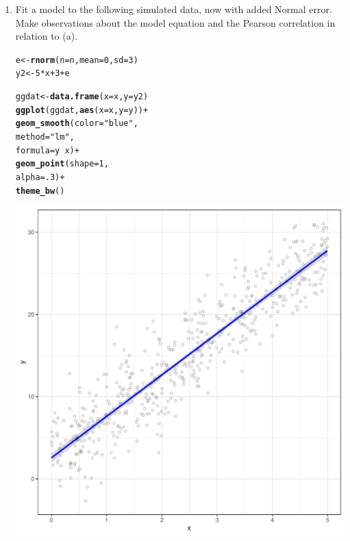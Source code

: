 \documentclass{article}\usepackage[]{graphicx}\usepackage[]{color}
\makeatletter
\def\maxwidth{ %
  \ifdim\Gin@nat@width>\linewidth
    \linewidth
  \else
    \Gin@nat@width
  \fi
}
\newcommand{\hlnum}[1]{\textcolor[rgb]{0.686,0.059,0.569}{#1}}%
\newcommand{\hlstr}[1]{\textcolor[rgb]{0.192,0.494,0.8}{#1}}%
\newcommand{\hlopt}[1]{\textcolor[rgb]{0,0,0}{#1}}%
\newcommand{\hlstd}[1]{\textcolor[rgb]{0.345,0.345,0.345}{#1}}%
\newcommand{\hlkwb}[1]{\textcolor[rgb]{0.69,0.353,0.396}{#1}}%
\newcommand{\hlkwc}[1]{\textcolor[rgb]{0.333,0.667,0.333}{#1}}%
\newcommand{\hlkwd}[1]{\textcolor[rgb]{0.737,0.353,0.396}{\textbf{#1}}}%
\newenvironment{kframe}{%
 \def\at@end@of@kframe{}%
 \ifinner\ifhmode%
  \def\at@end@of@kframe{\end{minipage}}%
  \begin{minipage}{\columnwidth}%
 \fi\fi%
 \def\FrameCommand##1{\hskip\@totalleftmargin \hskip-\fboxsep
 \colorbox{shadecolor}{##1}\hskip-\fboxsep
     \hskip-\linewidth \hskip-\@totalleftmargin \hskip\columnwidth}%
 \MakeFramed {\advance\hsize-\width
   \@totalleftmargin\z@ \linewidth\hsize
   \@setminipage}}%
 {\par\unskip\endMakeFramed%
 \at@end@of@kframe}
\newenvironment{knitrout}{}{} %
\makeatother
\begin{document}
\begin{enumerate}
\begin{enumerate}
  \item Fit a model to the following simulated data, now with added Normal error. Make
  observations about the model equation and the Pearson correlation in relation to (a).
\begin{knitrout}
\color{fgcolor}\begin{kframe}
\begin{alltt}
\hlstd{e}\hlkwb{<-}\hlkwd{rnorm}\hlstd{(}\hlkwc{n}\hlstd{=n,}\hlkwc{mean}\hlstd{=}\hlnum{0}\hlstd{,}\hlkwc{sd}\hlstd{=}\hlnum{3}\hlstd{)}
\hlstd{y2}\hlkwb{<-}\hlnum{5}\hlopt{*}\hlstd{x} \hlopt{+} \hlnum{3} \hlopt{+} \hlstd{e}

\hlstd{ggdat}\hlkwb{<-}\hlkwd{data.frame}\hlstd{(}\hlkwc{x}\hlstd{=x,} \hlkwc{y}\hlstd{=y2)}
\hlkwd{ggplot}\hlstd{(ggdat,} \hlkwd{aes}\hlstd{(}\hlkwc{x}\hlstd{=x,} \hlkwc{y}\hlstd{=y))}\hlopt{+}
  \hlkwd{geom_smooth}\hlstd{(}\hlkwc{color}\hlstd{=}\hlstr{"blue"}\hlstd{,}
              \hlkwc{method}\hlstd{=}\hlstr{"lm"}\hlstd{,}
              \hlkwc{formula}\hlstd{=y}\hlopt{~}\hlstd{x)}\hlopt{+}
  \hlkwd{geom_point}\hlstd{(}\hlkwc{shape}\hlstd{=}\hlnum{1}\hlstd{,}
             \hlkwc{alpha}\hlstd{=}\hlnum{.3}\hlstd{)}\hlopt{+}
  \hlkwd{theme_bw}\hlstd{()}
\end{alltt}
\end{kframe}
\includegraphics[width=\maxwidth]{figure/unnamed-chunk-13-1} 

\end{knitrout}
\end{enumerate}
\end{enumerate}
\end{document}

